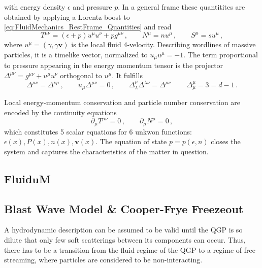 with energy density $\epsilon$ and pressure $p$.  In a general frame these quantitites are obtained by applying a Lorentz boost to \eqref{eq:FluidMechanics_RestFrame_Quantities} and read \cite{Rischke_2022,Weinberg_2008}
\begin{equation}
        T^{\mu\nu}=(\epsilon+p)u^\mu u^\nu+pg^{\mu\nu}\,,\qquad
        N^\mu       =nu^\mu\,,\qquad
        S^\mu       =su^\mu\,,
    \end{equation}
where $u^\mu=(\gamma,\gamma\mathbf{v})$ is the local fluid 4-velocity. Describing wordlines of massive particles, it is a timelike vector, normalized to ${u_\mu u^\mu=-1}$. The term proportional to pressure appearing in the energy momentum tensor is the projector ${\Delta^{\mu\nu}=g^{\mu\nu}+u^\mu u^\nu}$ orthogonal to $u^\mu$. It fulfills
\begin{equation}
    \Delta^{\mu\nu}=\Delta^{\nu\mu}\,,\qquad u_\mu\Delta^{\mu\nu}=0\,,\qquad\Delta^\mu_\lambda\Delta^{\lambda\nu}=\Delta^{\mu\nu}\,\qquad\Delta^\mu_\mu=3=d-1\,.
    \label{eq:FluidMechanics_ProjProperties}
\end{equation}

Local energy-momentum conservation and particle number conservation are encoded by the continuity equations
    \begin{equation}
        \partial_\mu T^{\mu\nu}  =0\,,\qquad
        \partial_\mu N^\mu       =0\,,
    \end{equation}
which constitutes 5 scalar equations for 6 unkwon functions: $\epsilon(x), P(x), n(x), \mathbf{v}(x)$. The equation of state $p=p(\epsilon,n)$ closes the system and captures the characteristics of the matter in question.




\subsection{Fluid$\mathbf{u}$M}


\subsection{Blast Wave Model \& Cooper-Frye Freezeout}

A hydrodynamic description can be assumed to be valid until the QGP is so dilute that only few soft scatterings between its components can occur. Thus, there has to be a transition from the fluid regime of the QGP to a regime of free streaming, where particles are considered to be non-interacting.

